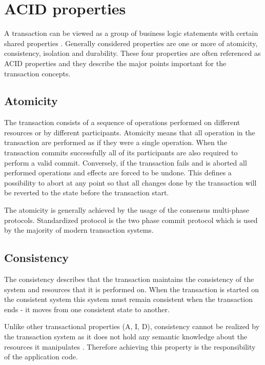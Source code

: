 \documentclass[oneside,
  digital, %
  table,   %
  nolof,     %
  nolot,     %
]{fithesis3}
\begin{document}
\section{ACID properties}

A transaction can be viewed as a group of business logic statements with certain shared properties \cite{nar_wf}. Generally considered properties are one or more of atomicity, consistency, isolation and durability. These four properties are often referenced as ACID properties \cite{haerder_reuter_1983} and they describe the major points important for the transaction concepts.

\subsection{Atomicity}

The transaction consists of a sequence of operations performed on different resources or by different participants. Atomicity means that all operation in the transaction are performed as if they were a single operation. When the transaction commits successfully all of its participants are also required to perform a valid commit. Conversely, if the transaction fails and is aborted all performed operations and effects are forced to be undone. This defines a possibility to abort at any point so that all changes done by the transaction will be reverted to the state before the transaction start.

The atomicity is generally achieved by the usage of the consensus multi-phase protocols. Standardized protocol is the two phase commit protocol which is used by the majority of modern transaction systems. 

\subsection{Consistency}

The consistency describes that the transaction maintains the consistency of the system and resources that it is performed on. When the transaction is started on the consistent system this system must remain consistent when the transaction ends - it moves from one consistent state to another.

Unlike other transactional properties (A, I, D), consistency cannot be realized by the transaction system as it does not hold any semantic knowledge about the resources it manipulates \cite{java_tran_processing}. Therefore achieving this property is the responsibility of the application code.
\end{document}
